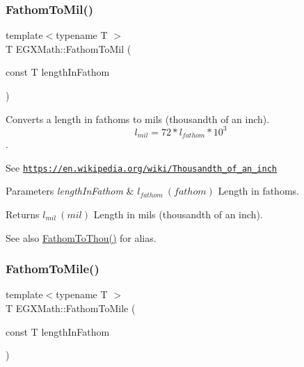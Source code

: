 \subsubsection{\texorpdfstring{Fathom\+To\+Mil()}{FathomToMil()}}
{\footnotesize\ttfamily template$<$typename T $>$ \\
T E\+G\+X\+Math\+::\+Fathom\+To\+Mil (\begin{DoxyParamCaption}\item[{const T}]{length\+In\+Fathom }\end{DoxyParamCaption})}



Converts a length in fathoms to mils (thousandth of an inch). \[ l_{mil}=72 * l_{fathom} * 10^{3} \]. 

See \href{https://en.wikipedia.org/wiki/Thousandth_of_an_inch}{\tt https\+://en.\+wikipedia.\+org/wiki/\+Thousandth\+\_\+of\+\_\+an\+\_\+inch} 
\begin{DoxyParams}{Parameters}
{\em length\+In\+Fathom} & $ l_{fathom}\ (fathom)$ Length in fathoms. \\
\hline
\end{DoxyParams}
\begin{DoxyReturn}{Returns}
$ l_{mil}\ (mil)$ Length in mils (thousandth of an inch). 
\end{DoxyReturn}
\begin{DoxySeeAlso}{See also}
\mbox{\hyperlink{group___e_g_x_math-_conversions-_length_conversions-_nautical-_fathom-_imperial_ga869f851e88866f34c0dca73f1b69bb21}{Fathom\+To\+Thou()}} for alias. 
\end{DoxySeeAlso}
\mbox{\label{group___e_g_x_math-_conversions-_length_conversions-_nautical-_fathom-_imperial_ga4922ca5fe88bedc7aaa78d15e64a5534}} 
\subsubsection{\texorpdfstring{Fathom\+To\+Mile()}{FathomToMile()}}
{\footnotesize\ttfamily template$<$typename T $>$ \\
T E\+G\+X\+Math\+::\+Fathom\+To\+Mile (\begin{DoxyParamCaption}\item[{const T}]{length\+In\+Fathom }\end{DoxyParamCaption})}



